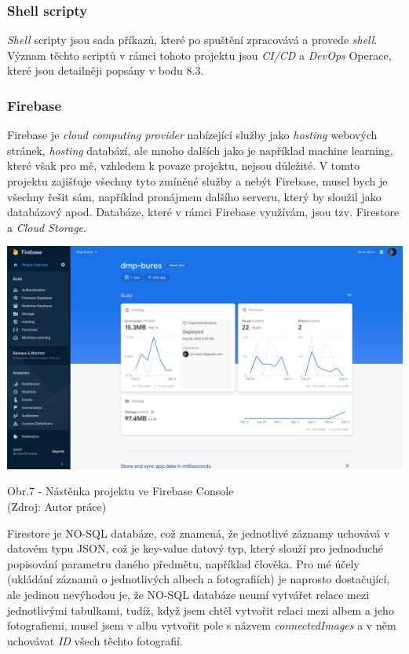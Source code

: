 \documentclass[12pt,a4paper]{report}
\begin{document}
  \subsubsection{Shell scripty}
  \emph{Shell} scripty jsou sada příkazů, které po spuštění zpracovává a provede \emph{shell}. Význam těchto
  scriptů v rámci tohoto projektu jsou \emph{CI/CD} a \emph{DevOps} Operace, které jsou detailněji popsány v bodu 8.3.
  \subsubsection{Firebase}
  Firebase je \emph{cloud computing provider} nabízející služby jako \emph{hosting} webových stránek, \emph{hosting}
  databází, ale mnoho dalších jako je například machine learning, které však pro mě, vzhledem k
  povaze projektu, nejsou důležité. V tomto projektu zajišťuje všechny tyto zmíněné služby a nebýt
  Firebase, musel bych je všechny řešit sám, například pronájmem dalšího serveru, který by sloužil jako databázový apod.
  Databáze, které v rámci Firebase využívám, jsou tzv. Firestore a \emph{Cloud Storage}.

  \vspace*{0.5cm}
  \noindent\includegraphics[width=\linewidth]{firebaseDash.png}
  \begin{center}
    Obr.7 -  Nástěnka projektu ve Firebase Console \\
    (Zdroj: Autor práce)
  \end{center}
  \vspace*{0.5cm}
  Firestore je NO-SQL databáze, což znamená, že jednotlivé záznamy uchovává v datovém typu
  JSON, což je key-value datový typ, který slouží pro jednoduché popisování parametru daného
  předmětu, například člověka. Pro mé účely (ukládání záznamů o jednotlivých albech a fotografiích)
  je naprosto dostačující, ale jedinou nevýhodou je, že NO-SQL databáze neumí vytvářet relace
  mezi jednotlivými tabulkami, tudíž, když jsem chtěl vytvořit relaci mezi albem a jeho fotografiemi,
  musel jsem v albu vytvořit pole s názvem \emph{connectedImages} a v něm uchovávat \emph{ID} všech těchto
  fotografií.
\end{document}
